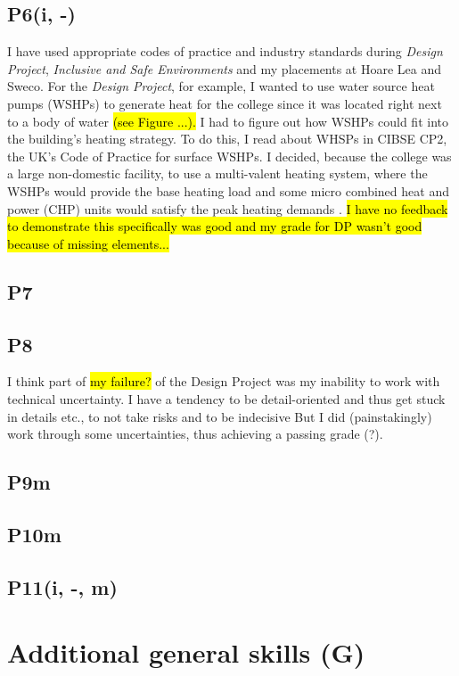 \subsection*{P6(i, -)}

I have used appropriate codes of practice and industry standards during \textit{Design Project}, \textit{Inclusive and Safe Environments} and my placements at Hoare Lea and Sweco.
For the \textit{Design Project}, for example, I wanted to use water source heat pumps (WSHPs) to generate heat for the college since it was located right next to a body of water \hl{(see Figure ...).}
I had to figure out how WSHPs could fit into the building's heating strategy.
To do this, I read about WHSPs in CIBSE CP2, the UK's Code of Practice for surface WSHPs.
I decided, because the college was a large non-domestic facility, to use a multi-valent heating system, where the WSHPs would provide the base heating load and some micro combined heat and power (CHP) units would satisfy the peak heating demands \citep[pp.~12,~38]{CP22016}.
\hl{I have no feedback to demonstrate this specifically was good and my grade for DP wasn't good because of missing elements...}


\subsection*{P7}


\subsection*{P8}

I think part of \hl{my failure?} of the Design Project was my inability to work with technical uncertainty.
I have a tendency to be detail-oriented and thus get stuck in details etc., to not take risks and to be indecisive
But I did (painstakingly) work through some uncertainties, thus achieving a passing grade (?).


\subsection*{P9m}


\subsection*{P10m}


\subsection*{P11(i, -, m)}



\section{Additional general skills (G)}
